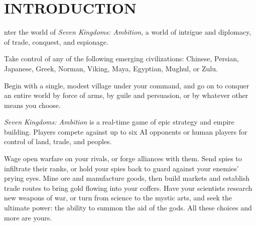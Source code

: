 
\chapter[Introduction]{{\Huge I}NTRODUCTION}

nter the world of \textit{Seven Kingdoms: Ambition}, a world
of intrigue and diplomacy, of trade, conquest, and espionage.


Take control of any of the following emerging civilizations: Chinese, Persian, Japanese, Greek, Norman, Viking, Maya, Egyptian, Mughul, or Zulu.

Begin with a single, modest village under your command, and go on to conquer an entire world by force of arms, by guile and persuasion, or by whatever other means you choose.

\textit{Seven Kingdoms: Ambition} is a real-time game of epic strategy and
empire building. Players compete against up to six AI opponents or human players
for control of land, trade, and peoples.

Wage open warfare on your rivals, or forge alliances with them. Send spies to infiltrate their ranks, or hold your spies back to guard against your enemies’ prying eyes. Mine ore and manufacture goods, then build markets and establish trade routes to bring gold flowing into your coffers. Have your scientists research new weapons of war, or turn from science to the mystic arts, and seek the ultimate power: the ability to summon the aid of the gods. All these choices and more are yours.